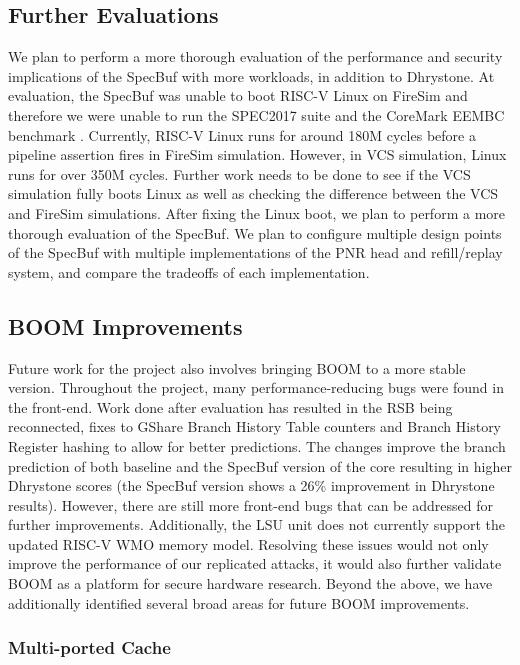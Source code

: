 \subsection{Further Evaluations}

We plan to perform a more thorough evaluation of the performance and security implications of the
SpecBuf with more workloads, in addition to Dhrystone. At evaluation, the SpecBuf was unable to boot
RISC-V Linux on FireSim and therefore we were unable to run the SPEC2017 suite and the CoreMark EEMBC benchmark \cite{b50, b51}.
Currently, RISC-V Linux runs for around 180M cycles before a pipeline assertion fires in FireSim simulation. However, 
in VCS simulation, Linux runs for over 350M cycles. Further work needs to be done to see if the VCS simulation
fully boots Linux as well as checking the difference between the VCS and FireSim simulations. After fixing the Linux boot, we
plan to perform a more thorough evaluation of the SpecBuf. We plan to configure multiple design
points of the SpecBuf with multiple implementations of the PNR head and refill/replay system,
and compare the tradeoffs of each implementation.

\subsection{BOOM Improvements}

Future work for the project also involves bringing BOOM to a more stable version. Throughout
the project, many performance-reducing bugs were found in the front-end. Work done after
evaluation has resulted in the RSB being reconnected, fixes to GShare Branch History
Table counters and Branch History Register hashing to allow for better predictions.
The changes improve the branch prediction of both baseline and the SpecBuf version of the core resulting in
higher Dhrystone scores (the SpecBuf version shows a 26\% improvement in Dhrystone results). 
However, there are still more front-end bugs that can be addressed for further improvements.
Additionally, the LSU unit does not currently support the updated RISC-V WMO memory model.
Resolving these issues would not only improve the performance of our replicated attacks,
it would also further validate BOOM as a platform for secure hardware research.
Beyond the above, we have additionally identified several broad areas for future BOOM improvements.

\subsubsection{Multi-ported Cache}


